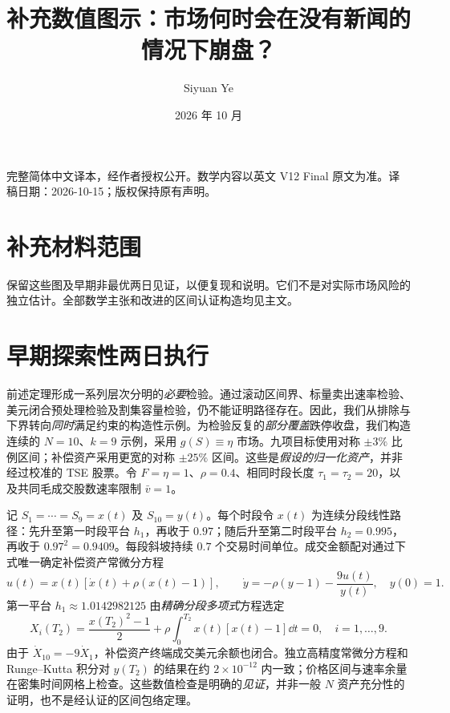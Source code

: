 \documentclass[10pt]{article}
\title{补充数值图示：市场何时会在没有新闻的情况下崩盘？}
\author{Siyuan Ye}\date{2026 年 10 月}
\begin{document}
\maketitle
\begin{center}\footnotesize 完整简体中文译本，经作者授权公开。数学内容以英文 V12 Final 原文为准。译稿日期：2026-10-15；版权保持原有声明。\end{center}
\section*{补充材料范围}
保留这些图及早期非最优两日见证，以便复现和说明。它们不是对实际市场风险的独立估计。全部数学主张和改进的区间认证构造均见主文。
\section*{早期探索性两日执行}

前述定理形成一系列层次分明的\emph{必要}检验。通过滚动区间界、标量卖出速率检验、美元闭合预处理检验及割集容量检验，仍不能证明路径存在。因此，我们从排除与下界转向\emph{同时}满足约束的构造性示例。为检验反复的\emph{部分覆盖}跌停收盘，我们构造连续的 $N=10$、$k=9$ 示例，采用 $g(S)\equiv\eta$ 市场。九项目标使用对称 $\pm3\%$ 比例区间；补偿资产采用更宽的对称 $\pm25\%$ 区间。这些是\emph{假设的归一化资产}，并非经过校准的 TSE 股票。令 $F=\eta=1$、$\rho=0.4$、相同时段长度 $\tau_1=\tau_2=20$，以及共同毛成交股数速率限制 $\bar v=1$。

记 $S_1=\cdots=S_9=x(t)$ 及 $S_{10}=y(t)$。每个时段令 $x(t)$ 为连续分段线性路径：先升至第一时段平台 $h_1$，再收于 $0.97$；随后升至第二时段平台 $h_2=0.995$，再收于 $0.97^2=0.9409$。每段斜坡持续 $0.7$ 个交易时间单位。成交金额配对通过下式唯一确定补偿资产常微分方程
\begin{equation}\label{eq:multiday-witness-ode}
 u(t)=x(t)[\dot x(t)+\rho(x(t)-1)],\qquad
 \dot y=-\rho(y-1)-\frac{9u(t)}{y(t)},\quad y(0)=1.
\end{equation}
第一平台 $h_1\approx1.0142982125$ 由\emph{精确分段多项式}方程选定
\begin{equation}\label{eq:multiday-closed}
 X_i(T_2)=\frac{x(T_2)^2-1}{2}+\rho\int_0^{T_2}x(t)[x(t)-1]\dd t=0,
 \quad i=1,\ldots,9.
\end{equation}
由于 $\dot X_{10}=-9\dot X_1$，补偿资产终端成交美元余额也闭合。独立高精度常微分方程和 Runge--Kutta 积分对 $y(T_2)$ 的结果在约 $2\times10^{-12}$ 内一致；价格区间与速率余量在密集时间网格上检查。这些数值检查是明确的\emph{见证}，并非一般 $N$ 资产充分性的证明，也不是经认证的区间包络定理。
\end{document}
